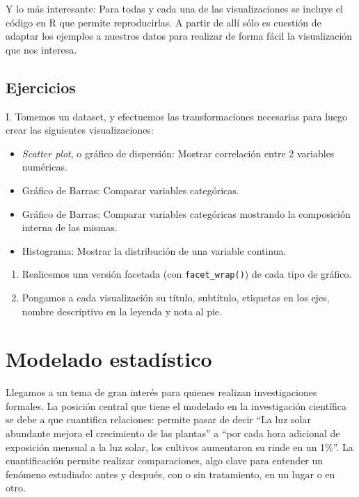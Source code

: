 \documentclass[spanish,]{book}
\providecommand{\tightlist}{%
  \setlength{\itemsep}{0pt}\setlength{\parskip}{0pt}}
\begin{document}
Y lo más interesante: Para todas y cada una de las visualizaciones se incluye el código en R que permite reproducirlas. A partir de allí sólo es cuestión de adaptar los ejemplos a nuestros datos para realizar de forma fácil la visualización que nos interesa.

\hypertarget{ejercicios-2}{%
\section{Ejercicios}\label{ejercicios-2}}

I. Tomemos un dataset, y efectuemos las transformaciones necesarias para luego crear las siguientes visualizaciones:

\begin{itemize}
\tightlist
\item
  \emph{Scatter plot}, o gráfico de dispersión: Mostrar correlación entre 2 variables numéricas.
\item
  Gráfico de Barras: Comparar variables categóricas.
\item
  Gráfico de Barras: Comparar variables categóricas mostrando la composición interna de las mismas.\\
\item
  Histograma: Mostrar la distribución de una variable continua.
\end{itemize}

\begin{enumerate}
\def\labelenumi{\Roman{enumi}.}
\setcounter{enumi}{1}
\item
  Realicemos una versión facetada (con \texttt{facet\_wrap()}) de cada tipo de gráfico.
\item
  Pongamos a cada visualización su título, subtítulo, etiquetas en los ejes, nombre descriptivo en la leyenda y nota al pie.
\end{enumerate}

\hypertarget{modelado-estaduxedstico}{%
\chapter{Modelado estadístico}\label{modelado-estaduxedstico}}

Llegamos a un tema de gran interés para quienes realizan investigaciones formales. La posición central que tiene el modelado en la investigación científica se debe a que cuantifica relaciones: permite pasar de decir ``La luz solar abundante mejora el crecimiento de las plantas'' a ``por cada hora adicional de exposición mensual a la luz solar, los cultivos aumentaron su rinde en un 1\%''. La cuantificación permite realizar comparaciones, algo clave para entender un fenómeno estudiado: antes y después, con o sin tratamiento, en un lugar o en otro.
\end{document}
